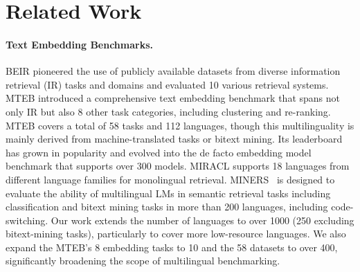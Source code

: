 \vspace{-1.5mm}
\section{Related Work}

\paragraph{Text Embedding Benchmarks.}
BEIR \citep{thakur2021beir} pioneered the use of publicly available datasets from diverse information retrieval (IR) tasks and domains and evaluated 10 various retrieval systems. MTEB \citep{muennighoff2023mteb} introduced a comprehensive text embedding benchmark that spans not only IR but also 8 other task categories, including clustering and re-ranking. MTEB covers a total of 58 tasks and 112 languages, though this multilinguality is mainly derived from machine-translated tasks or bitext mining. Its leaderboard has grown in popularity and evolved into the de facto embedding model benchmark that supports over 300 models. MIRACL \citep{zhang2022making} supports 18 languages from different language families for monolingual retrieval. MINERS~\citep{winata2024miners} is designed to evaluate the ability of multilingual LMs in semantic retrieval tasks including classification and bitext mining tasks in more than 200 languages, including code-switching. 
Our work extends the number of languages to over 1000 (250 excluding bitext-mining tasks), particularly to cover more low-resource languages. We also expand the MTEB's 8 embedding tasks to 10 and the 58 datasets to over 400, significantly broadening the scope of multilingual benchmarking.

